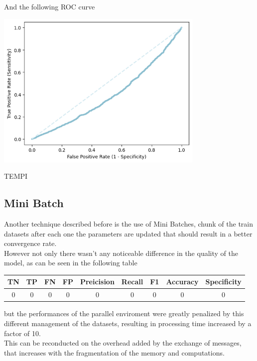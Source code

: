 \documentclass[
	letterpaper, %
	10pt, %
]{class}
\begin{document}
And the following ROC curve

\begin{center}
    \includegraphics[width=10cm]{../images/parallel_roc.png}
\end{center}

TEMPI

\subsection{Mini Batch}

Another technique described before is the use of Mini Batches, chunk of the train datasets after each one the parameters are updated that should result in a better convergence rate.\\
However not only there wasn't any noticeable difference in the quality of the model, as can be seen in the following table

\begin{center}
    \begin{tabular}{ |c|c|c|c|c|c|c|c|c| }
        \hline
        TN & TP & FN & FP & Preicision & Recall & F1 & Accuracy & Specificity \\
        \hline
        0  & 0  & 0  & 0  & 0          & 0      & 0  & 0        & 0           \\
        \hline
    \end{tabular}
\end{center}

but the performances of the parallel enviroment were greatly penalized by this different management of the datasets, resulting in processing time increased by a factor of 10.\\
This can be reconducted on the overhead added by the exchange of messages, that increases with the fragmentation of the memory and computations.
\end{document}
